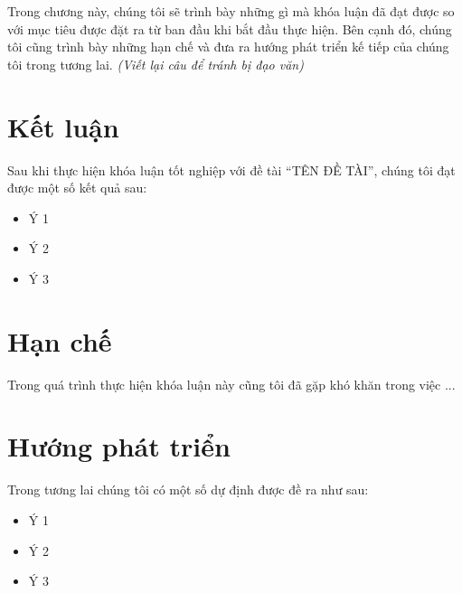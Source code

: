 Trong chương này, chúng tôi sẽ trình bày những gì mà khóa luận đã đạt được so với mục tiêu được đặt ra từ ban đầu khi bắt đầu thực hiện. Bên cạnh đó, chúng tôi cũng trình bày những hạn chế và đưa ra hướng phát triển kế tiếp của chúng tôi trong tương lai. \textit{(Viết lại câu để tránh bị đạo văn)}

\section{Kết luận}
Sau khi thực hiện khóa luận tốt nghiệp với đề tài ``TÊN ĐỀ TÀI'', chúng tôi đạt được một số kết quả sau:
\begin{itemize}
    \item Ý 1
    \item Ý 2
    \item Ý 3
\end{itemize}

\section{Hạn chế}
Trong quá trình thực hiện khóa luận này cũng tôi đã gặp khó khăn trong việc ...

\section{Hướng phát triển}
Trong tương lai chúng tôi có một số dự định được đề ra như sau:
\begin{itemize}
    \item Ý 1
    \item Ý 2
    \item Ý 3
\end{itemize}